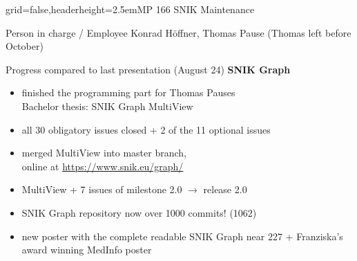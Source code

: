 \documentclass[english]{kiesgrube}
\begin{document}

\newpage

\begin{poster}{grid=false,headerheight=2.5em}{}{MP 166 SNIK Maintenance}{}{}
\begin{posterbox}[name=person,column=0,row=0]{Person in charge / Employee}
Konrad Höffner, Thomas Pause (Thomas left before October)
\end{posterbox}
\begin{posterbox}[name=progress,below=person]{Progress compared to last presentation (August 24)}
\textbf{SNIK Graph}
\begin{itemize}
\item finished the programming part for Thomas Pauses\\Bachelor thesis: SNIK Graph MultiView
\item all 30 obligatory issues closed + 2 of the 11 optional issues
\item merged MultiView into master branch,\\online at \url{https://www.snik.eu/graph/}
\item MultiView + 7 issues of milestone 2.0 $\rightarrow$ release 2.0 
\item SNIK Graph repository now over 1000 commits! (1062)
\item new poster with the complete readable SNIK Graph near 227 + Franziska's award winning MedInfo poster
\end{itemize}

\end{posterbox}
\end{poster}
\end{document}
